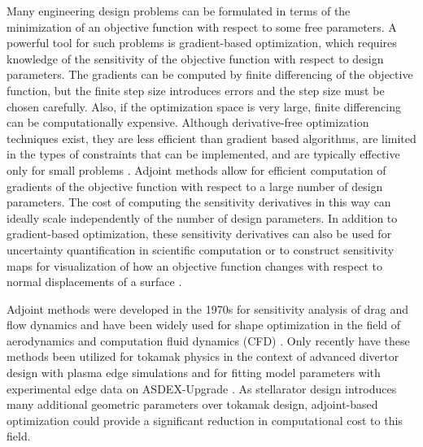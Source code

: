 \documentclass[aps,unsortedaddress]{revtex4-1}
\begin{document}


Many engineering design problems can be formulated in terms of the minimization of an objective function with respect to some free parameters. A powerful tool for such problems is gradient-based optimization, which requires knowledge of the sensitivity of the objective function with respect to design parameters. 
The gradients can be computed by finite differencing of the objective function, but the finite step size introduces errors and the step size must be chosen carefully. Also, if the optimization space is very large, finite differencing 
can be computationally expensive.
Although derivative-free optimization techniques exist, they are less efficient than gradient based algorithms,
are limited in the types of constraints that can be implemented,
and are typically effective only for small problems \cite{Nocedal2006}. Adjoint methods allow for efficient computation of gradients of the objective function with respect to a large number of design parameters. The cost of computing the sensitivity derivatives in this way can ideally scale independently of the number of design parameters. In addition to gradient-based optimization, these sensitivity derivatives can also be used for uncertainty quantification in scientific computation \cite{Roy2011} or to construct sensitivity maps for visualization of how an objective function changes with respect to normal displacements of a surface \cite{Othmer2008,Othmer2014}. 

Adjoint methods were developed in the 1970s for sensitivity analysis of drag and flow dynamics \cite{Pironneau1974} and have been widely used for shape optimization in the field of aerodynamics and computation fluid dynamics (CFD) \cite{Kuruvila1995,Jameson1998,Anderson1999,Othmer2008,Othmer2014}. Only recently have these methods been utilized for tokamak physics in the context of advanced divertor design with plasma edge simulations \cite{Baelmans2017} and for fitting model parameters with experimental edge data on ASDEX-Upgrade \cite{Kim2001}. As stellarator design introduces many additional geometric parameters over tokamak design, adjoint-based optimization could provide a significant reduction in computational cost to this field. 
\end{document}
